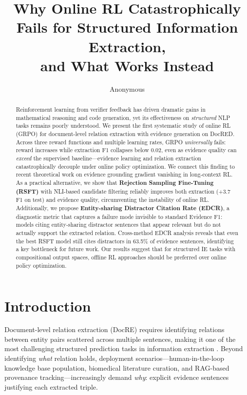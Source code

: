 \documentclass[11pt,a4paper]{article}
\title{Why Online RL Catastrophically Fails for Structured Information Extraction, \\and What Works Instead}
\author{Anonymous}
\date{}
\begin{document}
\maketitle

\begin{abstract}
Reinforcement learning from verifier feedback has driven dramatic gains in mathematical reasoning and code generation, yet its effectiveness on \emph{structured} NLP tasks remains poorly understood.
We present the first systematic study of online RL (GRPO) for document-level relation extraction with evidence generation on DocRED.
Across three reward functions and multiple learning rates, GRPO \emph{universally} fails: reward increases while extraction F1 collapses below 0.02, even as evidence quality can \emph{exceed} the supervised baseline---evidence learning and relation extraction catastrophically decouple under online policy optimization.
We connect this finding to recent theoretical work on evidence grounding gradient vanishing in long-context RL.
As a practical alternative, we show that \textbf{Rejection Sampling Fine-Tuning (RSFT)} with NLI-based candidate filtering reliably improves both extraction (+3.7 F1 on test) and evidence quality, circumventing the instability of online RL.
Additionally, we propose \textbf{Entity-sharing Distractor Citation Rate (EDCR)}, a diagnostic metric that captures a failure mode invisible to standard Evidence F1: models citing entity-sharing distractor sentences that appear relevant but do not actually support the extracted relation.
Cross-method EDCR analysis reveals that even the best RSFT model still cites distractors in 63.5\% of evidence sentences, identifying a key bottleneck for future work.
Our results suggest that for structured IE tasks with compositional output spaces, offline RL approaches should be preferred over online policy optimization.

\end{abstract}

\section{Introduction}
\label{sec:intro}

Document-level relation extraction (DocRE) requires identifying relations between entity pairs scattered across multiple sentences, making it one of the most challenging structured prediction tasks in information extraction \citep{yao2019docred}.
Beyond identifying \emph{what} relation holds, deployment scenarios---human-in-the-loop knowledge base population, biomedical literature curation, and RAG-based provenance tracking---increasingly demand \emph{why}: explicit evidence sentences justifying each extracted triple.
\end{document}
